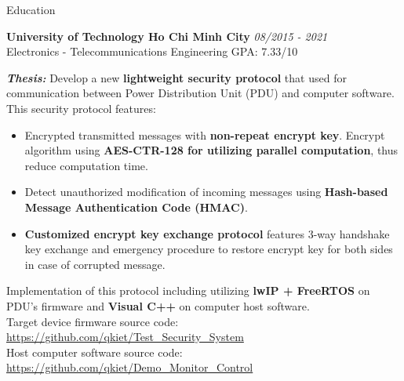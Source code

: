 \documentclass{resume} %
\begin{document}
\begin{rSection}{Education}

{\bf University of Technology Ho Chi Minh City} \hfill {\em 08/2015 - 2021}
\\ Electronics - Telecommunications Engineering\hfill { GPA: 7.33/10 }


\textbf{\textit{Thesis:}} Develop a new \textbf{lightweight security protocol} that used for communication between Power Distribution Unit (PDU) and computer software. This security protocol features:
\begin{itemize}
    \item Encrypted transmitted messages with \textbf{non-repeat encrypt key}. Encrypt algorithm using \textbf{AES-CTR-128 for utilizing parallel computation}, thus reduce computation time.
    \item Detect unauthorized modification of incoming messages using \textbf{Hash-based Message Authentication Code (HMAC)}.
    \item \textbf{Customized encrypt key exchange protocol} features 3-way handshake key exchange and emergency procedure to restore encrypt key for both sides in case of corrupted message.
\end{itemize}
Implementation of this protocol including utilizing \textbf{lwIP + FreeRTOS} on PDU's firmware and \textbf{Visual C++} on computer host software.\\
Target device firmware source code: \href{https://github.com/qkiet/Test_Security_System}{https://github.com/qkiet/Test\_Security\_System}\\
Host computer software source code:
\href{https://github.com/qkiet/Demo_Monitor_Control}{https://github.com/qkiet/Demo\_Monitor\_Control}\


\end{rSection}

\end{document}
